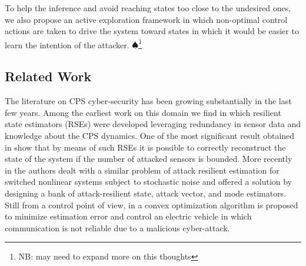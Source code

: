 \documentclass[letterpaper, 10 pt, conference]{ieeeconf}  %
\newcommand\NB[1]{$\spadesuit$\footnote{NB: #1}}
\begin{document}
To help the inference and avoid reaching states too close to the undesired ones, we also propose an active exploration framework in which non-optimal control actions are taken to drive the system toward states in which it would be easier to learn the intention of the attacker. \NB{may need to expand more on this thoughts}


\subsection{Related Work}\label{subsec:related}

The literature on CPS cyber-security has been growing substantially in the last few years. 
Among the earliest work on this domain we find \cite{Fawzi2014, Ivanov2014, Pajic2014, bezzo2014attack} in which resilient state estimators (RSEs) were developed leveraging redundancy in sensor data and knowledge about the CPS dynamics. One of the most significant result obtained in \cite{Fawzi2014, Pajic2014} show that by means of such RSEs it is possible to correctly reconstruct the state of the system if the number of attacked sensors is bounded.
More recently in \cite{kim2017attack} the authors dealt with a similar problem of attack resilient estimation for switched nonlinear systems subject to stochastic noise and offered a solution by designing a bank of attack-resilient state, attack vector, and mode estimators. Still from a control point of view, in \cite{rana2017attack} a convex optimization algorithm is proposed to minimize estimation error and control an electric vehicle in which communication is not reliable due to a malicious cyber-attack. 
\end{document}
